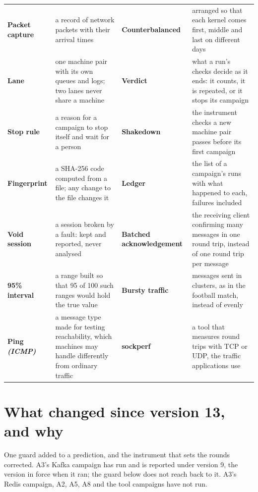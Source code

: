 \documentclass[11pt]{article}
\newcommand{\gl}[1]{{\color{soft}\itshape\small (#1)}}
\begin{document}
{\begin{tabularx}{\linewidth}{@{}>{\bfseries}p{3.1cm} X >{\bfseries}p{3.1cm} X@{}}
Packet capture & a record of network packets with their arrival times & Counterbalanced & arranged so that each kernel comes first, middle and last on different days \\
Lane & one machine pair with its own queues and logs; two lanes never share a machine & Verdict & what a run's checks decide as it ends: it counts, it is repeated, or it stops its campaign \\
Stop rule & a reason for a campaign to stop itself and wait for a person & Shakedown & the instrument checks a new machine pair passes before its first campaign \\
Fingerprint & a SHA-256 code computed from a file; any change to the file changes it & Ledger & the list of a campaign's runs with what happened to each, failures included \\
Void session & a session broken by a fault: kept and reported, never analysed & Batched acknowledgement & the receiving client confirming many messages in one round trip, instead of one round trip per message \\
95\% interval & a range built so that 95 of 100 such ranges would hold the true value & Bursty traffic & messages sent in clusters, as in the football match, instead of evenly \\
Ping \gl{ICMP} & a message type made for testing reachability, which machines may handle differently from ordinary traffic & sockperf & a tool that measures round trips with TCP or UDP, the traffic applications use \\
\end{tabularx}}

\section*{What changed since version 13, and why}
One guard added to a prediction, and the instrument that sets the rounds corrected. A3's Kafka campaign has run and is reported under version 9, the version in force when it ran; the guard below does not reach back to it. A3's Redis campaign, A2, A5, A8 and the tool campaigns have not run.
\end{document}

